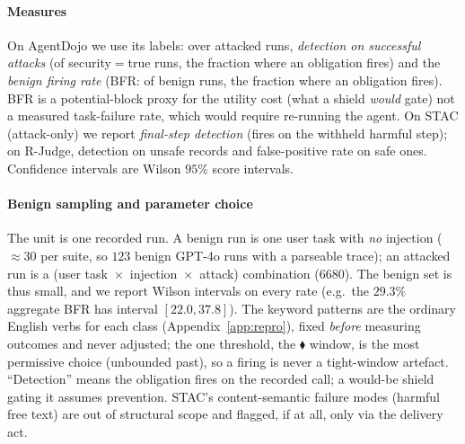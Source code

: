 \documentclass[sigconf]{acmart}
\begin{document}
\paragraph{Measures} On AgentDojo we use its labels: over attacked runs,
\emph{detection on successful attacks} (of \textsf{security}$=$true runs, the
fraction where an obligation fires) and the \emph{benign firing rate} (BFR: of benign
runs, the fraction where an obligation fires). BFR is a potential-block proxy for the
utility cost (what a shield \emph{would} gate) not a measured task-failure rate,
which would require re-running the agent. On STAC (attack-only) we
report \emph{final-step detection} (fires on the withheld harmful step); on R-Judge,
detection on unsafe records and false-positive rate on safe ones. Confidence
intervals are Wilson $95\%$ score intervals.

\paragraph{Benign sampling and parameter choice} The unit is one recorded run. A
benign run is one user task with \emph{no} injection ($\approx\!30$ per suite, so
$123$ benign GPT-4o runs with a parseable trace); an attacked run is a (user
task~$\times$~injection~$\times$~attack) combination ($6680$). The benign set is thus
small, and we report Wilson intervals on every rate (e.g.\ the $29.3\%$ aggregate BFR
has interval $[22.0,37.8]$). The keyword patterns are the ordinary English verbs for
each class (Appendix~\ref{app:repro}), fixed \emph{before} measuring outcomes and
never adjusted; the one threshold, the $\blacklozenge$ window, is the most permissive
choice (unbounded past), so a firing is never a tight-window artefact. ``Detection''
means the obligation fires on the recorded call; a would-be shield gating it assumes
prevention. STAC's content-semantic failure modes (harmful free text) are out of
structural scope and flagged, if at all, only via the delivery act.
\end{document}
